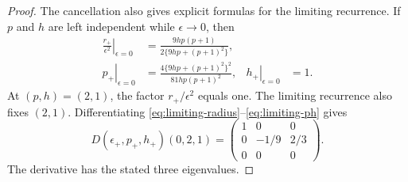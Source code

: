 \documentclass[11pt]{article}
\begin{document}
\begin{proof}
The cancellation also gives explicit formulas for the limiting recurrence.
If $p$ and $h$ are left independent while $\epsilon\to0$, then
\begin{align}
\left.\frac{r_+}{\epsilon^2}\right|_{\epsilon=0}
&=\frac{9hp(p+1)}{2\{9hp+(p+1)^2\}},
\label{eq:limiting-radius}\\
\left.p_+\right|_{\epsilon=0}
&=\frac{4\{9hp+(p+1)^2\}^2}
{81hp(p+1)^2},
&\left.h_+\right|_{\epsilon=0}&=1.
\label{eq:limiting-ph}
\end{align}
At $(p,h)=(2,1)$, the factor $r_+/\epsilon^2$ equals one.  The limiting
recurrence also fixes $(2,1)$.  Differentiating
\eqref{eq:limiting-radius}--\eqref{eq:limiting-ph}
gives
\begin{equation}\label{eq:limiting-jacobian}
D(\epsilon_+,p_+,h_+)(0,2,1)
=\begin{pmatrix}
1&0&0\\
0&-1/9&2/3\\
0&0&0
\end{pmatrix}.
\end{equation}
The derivative has the stated three eigenvalues.


\end{proof}
\end{document}
